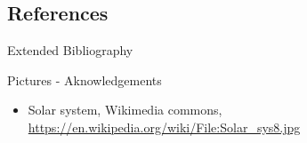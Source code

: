 \documentclass[beamer,handout,10pt]{standalone}
\begin{document}


\subsection{References}

\begin{frame}[t,allowframebreaks]{Extended Bibliography}
	
	
\end{frame}





\begin{frame}[t,allowframebreaks]{Pictures - Aknowledgements}
	\begin{itemize}
		
		\item Solar system, Wikimedia commons,
			\url{https://en.wikipedia.org/wiki/File:Solar_sys8.jpg}

	\end{itemize}
\end{frame}
\note[itemize]{
	\item
}



\end{document}
